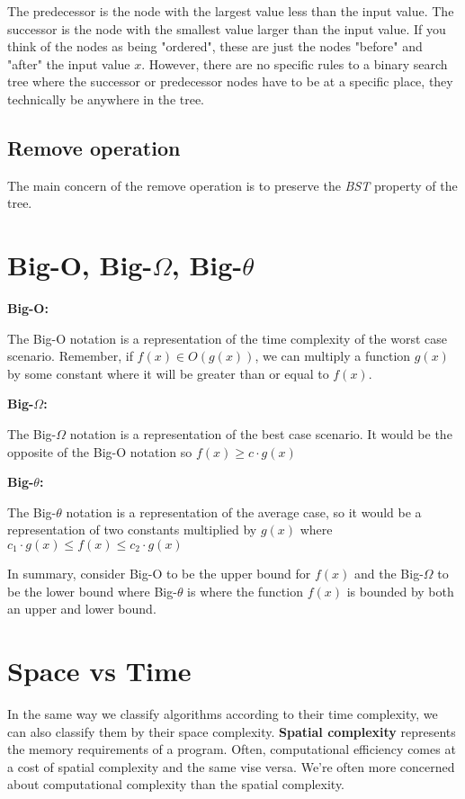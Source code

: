 \documentclass[11pt,a4paper,english]{paper}
\begin{document}
The predecessor is the node with the largest value less than the input value. The successor is the node with the smallest value larger than the input value. If you think of the nodes as being "ordered", these are just the nodes "before" and "after" the input value $x$. However, there are no specific rules to a binary search tree where the successor or predecessor nodes have to be at a specific place, they technically be anywhere in the tree.

\subsection{Remove operation}

The main concern of the remove operation is to preserve the \textit{BST} property of the tree.

\section{Big-O, Big-$\Omega$, Big-$\theta$}

\textbf{Big-O:}

The Big-O notation is a representation of the time complexity of the worst case scenario.  Remember, if $f(x) \in O(g(x))$, we can multiply a function $g(x)$ by some constant where it will be greater than or equal to $f(x)$. 


\bigskip
\noindent \textbf{Big-$\Omega$:}

The Big-$\Omega$ notation is a representation of the best case scenario. It would be the opposite of the Big-O notation so $f(x) \geq c\cdot g(x)$

\bigskip

\noindent \textbf{Big-$\theta$:}

The Big-$\theta$ notation is a representation of the average case, so it would be a representation of two constants multiplied by $g(x)$ where $c_1\cdot g(x) \leq f(x) \leq c_2\cdot g(x)$

\bigskip
\noindent In summary, consider Big-O to be the upper bound for $f(x)$ and the Big-$\Omega$ to be the lower bound where Big-$\theta$ is where the function $f(x)$ is bounded by both an upper and lower bound.

\section{Space vs Time}

In the same way we classify algorithms according to their time complexity, we can also classify them by their space complexity. \textbf{Spatial complexity} represents the memory requirements of a program. Often, computational efficiency comes at a cost of spatial complexity and the same vise versa. We're often more concerned about computational complexity than the spatial complexity.
\end{document}
